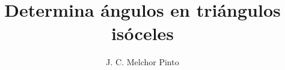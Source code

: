 \documentclass[12pt]{guia}
\title{Determina ángulos en triángulos isóceles}
\author{J. C. Melchor Pinto}
\begin{document}
\pagestyle{headandfoot}
\addpoints
\INFO
\printanswers
\vspace{-0.5cm}
\begin{multicols}{2}
    
    
    \columnbreak
    
\end{multicols}

% 
% 
\begin{questions}
    \questionboxed[10]{}
    \questionboxed[10]{}
    \questionboxed[10]{}
    \questionboxed[10]{}
    \questionboxed[10]{}
    \questionboxed[10]{}
    \questionboxed[10]{}
    \questionboxed[10]{}
    \questionboxed[10]{}
    \questionboxed[10]{}
\end{questions}
\end{document}
